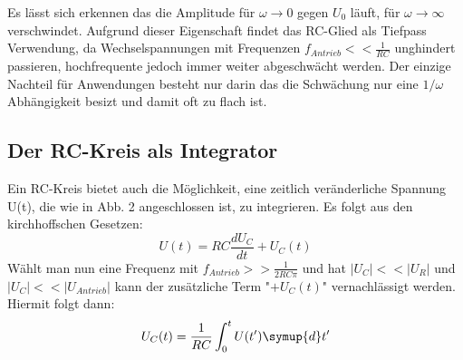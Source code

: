Es lässt sich erkennen das die Amplitude für $\omega \to 0$ gegen $U_0$ läuft, für
$\omega \to \infty$ verschwindet. Aufgrund dieser Eigenschaft findet das RC-Glied als
 Tiefpass Verwendung, da Wechselspannungen mit Frequenzen $f_{Antrieb} <<\frac{1}{RC}$
  unghindert passieren, hochfrequente jedoch immer weiter abgeschwächt werden.
  Der einzige Nachteil für Anwendungen besteht nur darin das die Schwächung nur eine $1/\omega$
  Abhängigkeit besizt und damit oft zu flach ist.

\subsection{Der RC-Kreis als Integrator}

Ein RC-Kreis bietet auch die Möglichkeit, eine zeitlich veränderliche Spannung U(t), die
wie in Abb. 2 angeschlossen ist, zu integrieren. Es folgt aus den kirchhoffschen Gesetzen:
\begin{equation}
  U(t) = RC\frac{dU_C}{dt}+U_C(t)
\end{equation}
Wählt man nun eine Frequenz mit $f_{Antrieb} >> \frac{1}{2RC \pi}$ und hat
$|U_C|<<|U_R|$ und $|U_C| << |U_{Antrieb}|$ kann der zusätzliche Term "$+ U_C(t)$"
 vernachlässigt werden. Hiermit folgt dann:
\begin{equation}
U_C(t) = \frac{1}{RC}\int_{0}^{t} U(t') \symup{d}t'
\end{equation}
